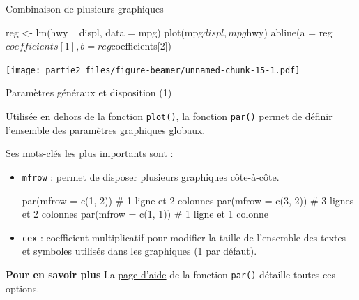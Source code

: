 \documentclass[12pt,ignorenonframetext,]{beamer}
\newenvironment{Shaded}{}{}
\newcommand{\CommentTok}[1]{\textcolor[rgb]{0.00,0.50,0.00}{#1}}
\newcommand{\DataTypeTok}[1]{#1}
\newcommand{\DecValTok}[1]{#1}
\newcommand{\KeywordTok}[1]{\textcolor[rgb]{0.00,0.00,1.00}{#1}}
\newcommand{\NormalTok}[1]{#1}
\newcommand{\OperatorTok}[1]{#1}
\newcommand{\StringTok}[1]{\textcolor[rgb]{0.00,0.50,0.50}{#1}}
\renewenvironment{Shaded}{\begin{snugshade}}{\end{snugshade}}
\begin{document}
\begin{frame}[fragile]{Combinaison de plusieurs graphiques}
\protect\hypertarget{combinaison-de-plusieurs-graphiques-1}{}

\footnotesize

\begin{Shaded}
\begin{Highlighting}[]
\NormalTok{reg <-}\StringTok{ }\KeywordTok{lm}\NormalTok{(hwy }\OperatorTok{~}\StringTok{ }\NormalTok{displ, }\DataTypeTok{data =}\NormalTok{ mpg)}
\KeywordTok{plot}\NormalTok{(mpg}\OperatorTok{$}\NormalTok{displ, mpg}\OperatorTok{$}\NormalTok{hwy)}
\KeywordTok{abline}\NormalTok{(}\DataTypeTok{a =}\NormalTok{ reg}\OperatorTok{$}\NormalTok{coefficients[}\DecValTok{1}\NormalTok{], }\DataTypeTok{b =}\NormalTok{ reg}\OperatorTok{$}\NormalTok{coefficients[}\DecValTok{2}\NormalTok{])}
\end{Highlighting}
\end{Shaded}

\texttt{[image: partie2\_files/figure-beamer/unnamed-chunk-15-1.pdf]}

\end{frame}

\begin{frame}[fragile]{Paramètres généraux et disposition (1)}
\protect\hypertarget{parametres-generaux-et-disposition-1}{}

Utilisée en dehors de la fonction \texttt{plot()}, la fonction
\texttt{par()} permet de définir l’ensemble des paramètres graphiques
globaux.

\pause Ses mots-clés les plus importants sont :

\begin{itemize}
\item
  \texttt{mfrow} : permet de disposer plusieurs graphiques côte-à-côte.

\begin{Shaded}
\begin{Highlighting}[]
\KeywordTok{par}\NormalTok{(}\DataTypeTok{mfrow =} \KeywordTok{c}\NormalTok{(}\DecValTok{1}\NormalTok{, }\DecValTok{2}\NormalTok{)) }\CommentTok{# 1 ligne et 2 colonnes}
\KeywordTok{par}\NormalTok{(}\DataTypeTok{mfrow =} \KeywordTok{c}\NormalTok{(}\DecValTok{3}\NormalTok{, }\DecValTok{2}\NormalTok{)) }\CommentTok{# 3 lignes et 2 colonnes}
\KeywordTok{par}\NormalTok{(}\DataTypeTok{mfrow =} \KeywordTok{c}\NormalTok{(}\DecValTok{1}\NormalTok{, }\DecValTok{1}\NormalTok{)) }\CommentTok{# 1 ligne et 1 colonne}
\end{Highlighting}
\end{Shaded}
\item
  \texttt{cex} : coefficient multiplicatif pour modifier la taille de
  l’ensemble des textes et symboles utilisés dans les graphiques (1 par
  défaut).
\end{itemize}

\pause

\textbf{Pour en savoir plus} La
\href{http://stat.ethz.ch/R-manual/R-devel/library/graphics/html/par.html}{page
d’aide} de la fonction \texttt{par()} détaille toutes ces options.

\end{frame}
\end{document}
